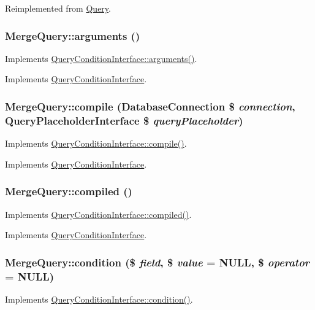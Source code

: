 Reimplemented from \hyperlink{classQuery_a16c3a3265666b784d49ce18a6fda9a8a}{Query}.\hypertarget{classMergeQuery_aa059b4fd2916e10075582091bfa03975}{
\subsubsection[{arguments}]{\setlength{\rightskip}{0pt plus 5cm}MergeQuery::arguments ()}}
\label{classMergeQuery_aa059b4fd2916e10075582091bfa03975}
Implements \hyperlink{interfaceQueryConditionInterface_ac2349e02d5332412182cf472ba1a1b1e}{QueryConditionInterface::arguments()}. 

Implements \hyperlink{interfaceQueryConditionInterface_ac2349e02d5332412182cf472ba1a1b1e}{QueryConditionInterface}.\hypertarget{classMergeQuery_a33436167b6e2ddc710b2a51db146ea67}{
\subsubsection[{compile}]{\setlength{\rightskip}{0pt plus 5cm}MergeQuery::compile ({\bf DatabaseConnection} \$ {\em connection}, \/  {\bf QueryPlaceholderInterface} \$ {\em queryPlaceholder})}}
\label{classMergeQuery_a33436167b6e2ddc710b2a51db146ea67}
Implements \hyperlink{interfaceQueryConditionInterface_ad409672ac9ac50787eec52ecdf5a60b1}{QueryConditionInterface::compile()}. 

Implements \hyperlink{interfaceQueryConditionInterface_ad409672ac9ac50787eec52ecdf5a60b1}{QueryConditionInterface}.\hypertarget{classMergeQuery_ab6c0c905db976734e61d6ef997bd3a6a}{
\subsubsection[{compiled}]{\setlength{\rightskip}{0pt plus 5cm}MergeQuery::compiled ()}}
\label{classMergeQuery_ab6c0c905db976734e61d6ef997bd3a6a}
Implements \hyperlink{interfaceQueryConditionInterface_a4aac3f4505275edecad9c22351e591cb}{QueryConditionInterface::compiled()}. 

Implements \hyperlink{interfaceQueryConditionInterface_a4aac3f4505275edecad9c22351e591cb}{QueryConditionInterface}.\hypertarget{classMergeQuery_a40d55b36952248da6d8eabb0eb1a8430}{
\subsubsection[{condition}]{\setlength{\rightskip}{0pt plus 5cm}MergeQuery::condition (\$ {\em field}, \/  \$ {\em value} = {\ttfamily NULL}, \/  \$ {\em operator} = {\ttfamily NULL})}}
\label{classMergeQuery_a40d55b36952248da6d8eabb0eb1a8430}
Implements \hyperlink{interfaceQueryConditionInterface_aa6d9d96fa17441b5222d1ffddd4c1799}{QueryConditionInterface::condition()}. 

